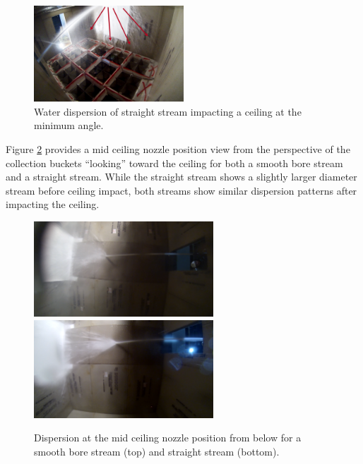 \documentclass[12pt,oneside]{book}
\begin{document}
\begin{figure}[!ht]
\centering
\includegraphics[width=0.5\textwidth]{Figures/Water_Distribution/Nozzle_Directions/Exterior_MinAngleCeiling_SS_FirstFloor_Arrows}
\caption[Water Dispersion Straight Stream Minimum Angle Ceiling]{Water dispersion of straight stream impacting a ceiling at the minimum angle.}
\label{fig:MinAngleCeilingImpact}
\end{figure}

Figure \ref{fig:Mid_Ceiling_Dispersion} provides a mid ceiling nozzle position view from the perspective of the collection buckets ``looking'' toward the ceiling for both a smooth bore stream and a straight stream. While the straight stream shows a slightly larger diameter stream before ceiling impact, both streams show similar dispersion patterns after impacting the ceiling. 

\begin{figure}[!ht]
\centering
\centering
\includegraphics[width=0.6\textwidth]{Figures/Water_Distribution/Nozzle_Directions/Exterior_MidCeiling_SB_FirstFloor_Under} \\
\includegraphics[width=0.6\textwidth]{Figures/Water_Distribution/Nozzle_Directions/Exterior_MidCeiling_SS_FirstFloor_Under}
\caption[Water Dispersion for Smooth Bore Stream and Straight Stream at Mid Ceiling]{Dispersion at the  mid ceiling nozzle position from below for a smooth bore stream (top) and straight stream (bottom).}
\label{fig:Mid_Ceiling_Dispersion}
\end{figure}
\end{document}
